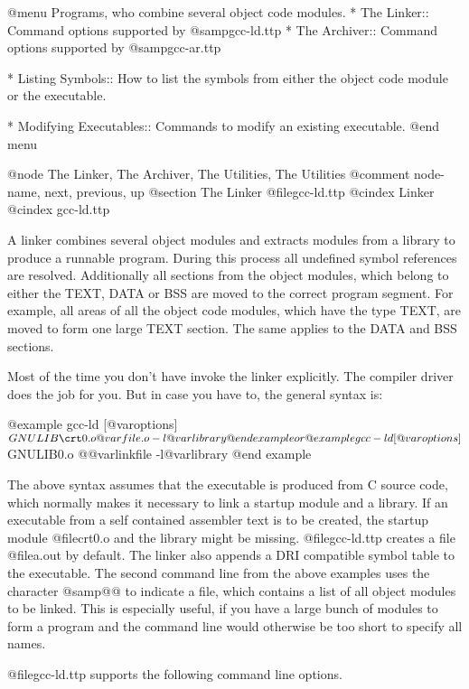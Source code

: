 {{{{{@menu
Programs, who combine several object code modules.
* The Linker::       Command options supported by @samp{gcc-ld.ttp}
* The Archiver::     Command options supported by @samp{gcc-ar.ttp}

* Listing Symbols::  How to list the symbols from either the object
                      code module or the executable.

* Modifying Executables::
                     Commands to modify an existing executable.
@end menu

@node     The Linker, The Archiver, The Utilities, The Utilities
@comment  node-name,  next,          previous,      up
@section The Linker @file{gcc-ld.ttp}
@cindex Linker
@cindex gcc-ld.ttp

A linker combines several object modules and extracts modules from a
library to produce a runnable program. During this process all undefined
symbol references are resolved. Additionally all sections from the object
modules, which belong to either the TEXT, DATA or BSS are moved to the
correct program segment. For example, all areas of all the object code
modules, which have the type TEXT, are moved to form one large TEXT
section. The same applies to the DATA and BSS sections.

Most of the time you don't have invoke the linker explicitly. The
compiler driver does the job for you. But in case you have to, the
general syntax is:

@example
gcc-ld [@var{options}] $GNULIB\crt0.o @var{file}.o -l@var{library}
@end example

or

@example
gcc-ld [@var{options}] $GNULIB\crt0.o @@var{linkfile} -l@var{library}
@end example

The above syntax assumes that the executable is produced from C source
code, which normally makes it necessary to link a startup module and a
library. If an executable from a self contained assembler text is to be
created, the startup module @file{crt0.o} and the library might be
missing. @file{gcc-ld.ttp} creates a file @file{a.out} by default. The
linker also appends a DRI compatible symbol table to the executable. The
second command line from the above examples uses the character @samp{@@}
to indicate a file, which contains a list of all object modules to be
linked. This is especially useful, if you have a large bunch of modules
to form a program and the command line would otherwise be too short to
specify all names.

@file{gcc-ld.ttp} supports the following command line options.

}}}}}
